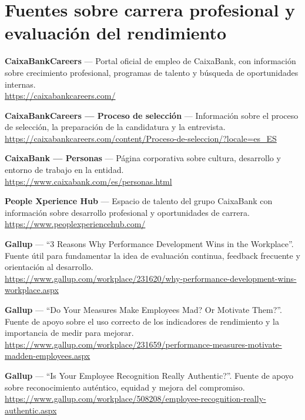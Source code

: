 \section*{Fuentes sobre carrera profesional y evaluación del rendimiento}

\begin{enumerate}[label={[\arabic*]}, resume]

  \item \textbf{CaixaBankCareers} --- Portal oficial de empleo de CaixaBank, con información sobre crecimiento profesional, programas de talento y búsqueda de oportunidades internas.\\
        \url{https://caixabankcareers.com/}

  \item \textbf{CaixaBankCareers --- Proceso de selección} --- Información sobre el proceso de selección, la preparación de la candidatura y la entrevista.\\
        \url{https://caixabankcareers.com/content/Proceso-de-seleccion/?locale=es_ES}

  \item \textbf{CaixaBank --- Personas} --- Página corporativa sobre cultura, desarrollo y entorno de trabajo en la entidad.\\
        \url{https://www.caixabank.com/es/personas.html}

  \item \textbf{People Xperience Hub} --- Espacio de talento del grupo CaixaBank con información sobre desarrollo profesional y oportunidades de carrera.\\
        \url{https://www.peoplexperiencehub.com/}

  \item \textbf{Gallup} --- ``3 Reasons Why Performance Development Wins in the Workplace''. Fuente útil para fundamentar la idea de evaluación continua, feedback frecuente y orientación al desarrollo.\\
        \url{https://www.gallup.com/workplace/231620/why-performance-development-wins-workplace.aspx}

  \item \textbf{Gallup} --- ``Do Your Measures Make Employees Mad? Or Motivate Them?''. Fuente de apoyo sobre el uso correcto de los indicadores de rendimiento y la importancia de medir para mejorar.\\
        \url{https://www.gallup.com/workplace/231659/performance-measures-motivate-madden-employees.aspx}

  \item \textbf{Gallup} --- ``Is Your Employee Recognition Really Authentic?''. Fuente de apoyo sobre reconocimiento auténtico, equidad y mejora del compromiso.\\
        \url{https://www.gallup.com/workplace/508208/employee-recognition-really-authentic.aspx}

\end{enumerate}

